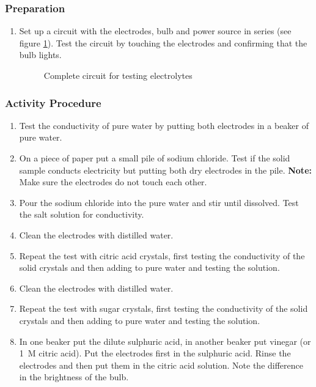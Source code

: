 \subsubsection*{Preparation}
\begin{enumerate}
\item{Set up a circuit with the electrodes, bulb and power source in series (see figure \ref{electrolyte-circuit}). Test the circuit by touching the electrodes and confirming that the bulb lights.}
\begin{figure}[h]
\begin{center}
\def\svgwidth{150pt}

\caption{Complete circuit for testing electrolytes}
\label{electrolyte-circuit}
\end{center}
\end{figure}
\end{enumerate}

\subsubsection*{Activity Procedure}
\begin{enumerate}

\item{Test the conductivity of pure water by putting both electrodes in a beaker of pure water.}
\item{On a piece of paper put a small pile of sodium chloride. Test if the solid sample conducts electricity but putting both dry electrodes in the pile. \textbf{Note:} Make sure the electrodes do not touch each other.}
\item{Pour the sodium chloride into the pure water and stir until dissolved. Test the salt solution for conductivity.}
\item{Clean the electrodes with distilled water.}
\item{Repeat the test with citric acid crystals, first testing the conductivity of the solid crystals and then adding to pure water and testing the solution.}
\item{Clean the electrodes with distilled water.}
\item{Repeat the test with sugar crystals, first testing the conductivity of the solid crystals and then adding to pure water and testing the solution.}
\item{In one beaker put the dilute sulphuric acid, in another beaker put vinegar (or 1~M citric acid). Put the electrodes first in the sulphuric acid. Rinse the electrodes and then put them in the citric acid solution. Note the difference in the brightness of the bulb.}
\end{enumerate}

